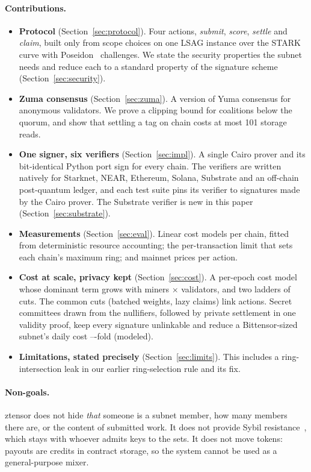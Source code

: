 \documentclass[11pt]{article}
\theoremstyle{remark}
\begin{document}
\paragraph{Contributions.}
\begin{itemize}
\item \textbf{Protocol} (Section~\ref{sec:protocol}). Four actions, \emph{submit}, \emph{score}, \emph{settle} and \emph{claim}, built only from scope choices on one LSAG instance over the STARK curve with Poseidon~\cite{poseidon} challenges. We state the security properties the subnet needs and reduce each to a standard property of the signature scheme (Section~\ref{sec:security}).
\item \textbf{Zuma consensus} (Section~\ref{sec:zuma}). A version of Yuma consensus for anonymous validators. We prove a clipping bound for coalitions below the quorum, and show that settling a tag on chain costs at most 101 storage reads.
\item \textbf{One signer, six verifiers} (Section~\ref{sec:impl}). A single Cairo prover and its bit-identical Python port sign for every chain. The verifiers are written natively for Starknet, NEAR, Ethereum, Solana, Substrate and an off-chain post-quantum ledger, and each test suite pins its verifier to signatures made by the Cairo prover. The Substrate verifier is new in this paper (Section~\ref{sec:substrate}).
\item \textbf{Measurements} (Section~\ref{sec:eval}). Linear cost models per chain, fitted from deterministic resource accounting; the per-transaction limit that sets each chain's maximum ring; and mainnet prices per action.
\item \textbf{Cost at scale, privacy kept} (Section~\ref{sec:cost}). A per-epoch cost model whose dominant term grows with miners $\times$ validators, and two ladders of cuts. The common cuts (batched weights, lazy claims) link actions. Secret committees drawn from the nullifiers, followed by private settlement in one validity proof, keep every signature unlinkable and reduce a Bittensor-sized subnet's daily cost \scaleMinRatio--\scaleMaxRatio-fold (modeled).
\item \textbf{Limitations, stated precisely} (Section~\ref{sec:limits}). This includes a ring-intersection leak in our earlier ring-selection rule and its fix.
\end{itemize}

\paragraph{Non-goals.} ztensor does not hide \emph{that} someone is a subnet member, how many members there are, or the content of submitted work. It does not provide Sybil resistance~\cite{sybil}, which stays with whoever admits keys to the sets. It does not move tokens: payouts are credits in contract storage, so the system cannot be used as a general-purpose mixer.
\end{document}
